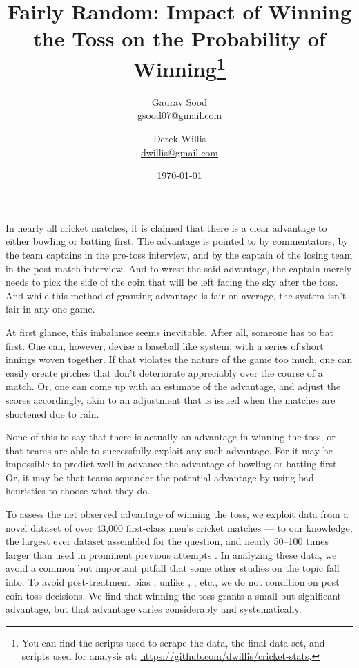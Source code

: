 \documentclass[12pt]{article}
\begin{document}
\title{\vspace{-.5cm}\normalsize{Fairly Random: Impact of Winning the Toss on the Probability of Winning\footnote{You can find the scripts used to scrape the data, the final data set, and scripts used for analysis at: \href{https://github.com/dwillis/cricket-stats}{https://github.com/dwillis/cricket-stats}.}\vspace{.5cm}}}
\author{\normalsize{Gaurav Sood}\\\href{mailto:gsood07@gmail.com}{\small{gsood07@gmail.com}} \and \normalsize{Derek Willis}\\\href{mailto:dwillis@gmail.com}{\small{dwillis@gmail.com}}}
\date{\vspace{.5cm}\normalsize{\today}}
\maketitle
\doublespacing

In nearly all cricket matches, it is claimed that there is a clear advantage to either bowling or batting first. The advantage is pointed to by commentators, by the team captains in the pre-toss interview, and by the captain of the losing team in the post-match interview. And to wrest the said advantage, the captain merely needs to pick the side of the coin that will be left facing the sky after the toss. And while this method of granting advantage is fair on average, the system isn't fair in any one game. 

At first glance, this imbalance seems inevitable. After all, someone has to bat first. One can, however, devise a baseball like system, with a series of short innings woven together. If that violates the nature of the game too much, one can easily create pitches that don't deteriorate appreciably over the course of a match. Or, one can come up with an estimate of the advantage, and adjust the scores accordingly, akin to an adjustment that is issued when the matches are shortened due to rain.

None of this to say that there is actually an advantage in winning the toss, or that teams are able to successfully exploit any such advantage. For it may be impossible to predict well in advance the advantage of bowling or batting first. Or, it may be that teams squander the potential advantage by using bad heuristics to choose what they do. 

To assess the net observed advantage of winning the toss, we exploit data from a novel dataset of over 43,000 first-class men's cricket matches --- to our knowledge, the largest ever dataset assembled for the question, and nearly 50--100 times larger than used in prominent previous attempts \citep[see,][]{dawson2009bat, de1998winning}. In analyzing these data, we avoid a common but important pitfall that some other studies on the topic fall into. To avoid post-treatment bias \citep[see][]{acharya2015}, unlike \citet{dawson2009bat}, \citet{Saad2015}, etc., we do not condition on post coin-toss decisions. We find that winning the toss grants a small but significant advantage, but that advantage varies considerably and systematically. 
\end{document}
